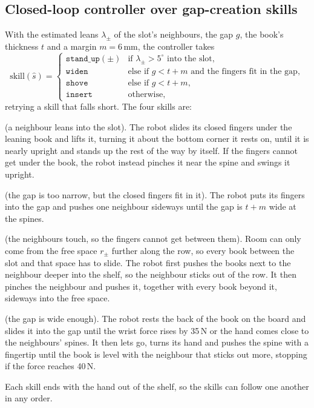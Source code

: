 \documentclass{article}
\begin{document}
\subsection{Closed-loop controller over gap-creation skills}
\label{sec:controller}
With the estimated leans $\lambda_\pm$ of the slot's neighbours, the gap $g$, the book's thickness $t$ and a
margin $m = 6$\,mm, the controller takes
\begin{equation}
\text{skill}(\hat{s}) =
\begin{cases}
\texttt{stand\_up}(\pm) & \text{if } \lambda_\pm > 5^\circ \text{ into the slot},\\
\texttt{widen} & \text{else if } g < t + m \text{ and the fingers fit in the gap},\\
\texttt{shove} & \text{else if } g < t + m,\\
\texttt{insert} & \text{otherwise,}
\end{cases}
\end{equation}
retrying a skill that falls short. The four skills are:
\begin{compactdesc}
  \item[Stand up] (a neighbour leans into the slot). The robot slides its closed fingers under the leaning
  book and lifts it, turning it about the bottom corner it rests on, until it is nearly upright and stands
  up the rest of the way by itself. If the fingers cannot get under the book, the robot instead pinches it
  near the spine and swings it upright.
  \item[Widen] (the gap is too narrow, but the closed fingers fit in it). The robot puts its fingers into
  the gap and pushes one neighbour sideways until the gap is $t + m$ wide at the spines.
  \item[Shove] (the neighbours touch, so the fingers cannot get between them). Room can only come from the
  free space $r_\pm$ further along the row, so every book between the slot and that space has to slide.
  The robot first pushes the books next to the neighbour deeper into the shelf, so the neighbour sticks out
  of the row. It then pinches the neighbour and pushes it, together with every book beyond it, sideways
  into the free space.
  \item[Insert] (the gap is wide enough). The robot rests the back of the book on the board and slides it
  into the gap until the wrist force rises by 35\,N or the hand comes close to the neighbours' spines. It
  then lets go, turns its hand and pushes the spine with a fingertip until the book is level with the
  neighbour that sticks out more, stopping if the force reaches 40\,N.
\end{compactdesc}
Each skill ends with the hand out of the shelf, so the skills can follow one another in any order.
\end{document}
